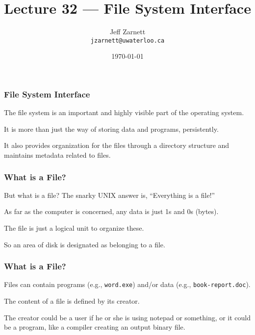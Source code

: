 

\title{Lecture 32 --- File System Interface }

\author{Jeff Zarnett \\ \small \texttt{jzarnett@uwaterloo.ca}}
\date{\today}




\begin{frame}
  \titlepage

 \end{frame}



\begin{frame}
\frametitle{File System Interface}

The file system is an important and highly visible part of the operating system. 

It is more than just the way of storing data and programs, persistently.

It also provides organization for the files through a directory structure and maintains metadata related to files. 

\end{frame}

\begin{frame}
\frametitle{What is a File?}

But what is a file? The snarky UNIX answer is, ``Everything is a file!''

As far as the computer is concerned, any data is just 1s and 0s (bytes). 

The file is just a logical unit to organize these. 

So an area of disk is designated as belonging to a file. 

\end{frame}

\begin{frame}
\frametitle{What is a File?}

Files can contain programs (e.g., \texttt{word.exe}) and/or data (e.g., \texttt{book-report.doc}). 

The content of a file is defined by its creator. 

The creator could be a user if he or she is using notepad or something, or it could be a program, like a compiler creating an output binary file.

\end{frame}


